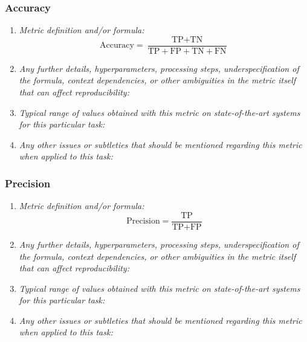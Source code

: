 \documentclass[a4paper,11pt]{article}
\begin{document}
        \subsubsection{Accuracy}
            \begin{enumerate}[label=\alph*.]
                \item \textit{Metric definition and/or formula:}
                    \begin{equation}
                        \textrm{Accuracy} = \frac{\textrm{TP} + \textrm{TN}}{\textrm{TP} + \textrm{FP} + \textrm{TN} + \textrm{FN}}
                    \end{equation}
                \bigskip
                \item \textit{Any further details, hyperparameters, processing steps, underspecification of the formula, context dependencies, or other ambiguities in the metric itself that can affect reproducibility:}
                \bigskip
                \item \textit{Typical range of values obtained with this metric on state-of-the-art systems for this particular task:}
                \bigskip
                \item \textit{Any other issues or subtleties that should be mentioned regarding this metric when applied to this task:}
                \bigskip
            \end{enumerate}
        \subsubsection{Precision}
            \begin{enumerate}[label=\alph*.]
                \item \textit{Metric definition and/or formula:}
                    \begin{equation}
                        \textrm{Precision} = \frac{\textrm{TP}}{\textrm{TP} + \textrm{FP}}
                    \end{equation}
                \bigskip
                \item \textit{Any further details, hyperparameters, processing steps, underspecification of the formula, context dependencies, or other ambiguities in the metric itself that can affect reproducibility:}
                \bigskip
                \item \textit{Typical range of values obtained with this metric on state-of-the-art systems for this particular task:}
                \bigskip
                \item \textit{Any other issues or subtleties that should be mentioned regarding this metric when applied to this task:}
                \bigskip
            \end{enumerate}
\end{document}
